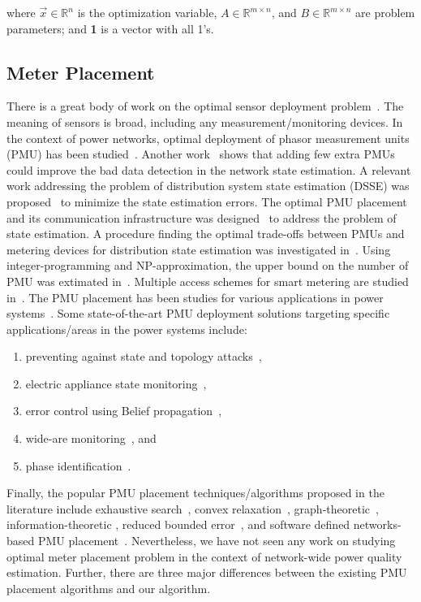 where $\vec{x}\in \mathbb{R}^n$ is the optimization variable, $A \in \mathbb{R}^{m \times n}$, and $B \in \mathbb{R}^{m \times n}$ are problem parameters;  and \textbf{1} is a vector with all 1's.

\subsection{Meter Placement}
There is a great body of work on the optimal sensor deployment problem~\cite{Krause09}. The meaning of sensors is broad, including any measurement/monitoring devices. In the context of power networks, optimal deployment of phasor measurement units (PMU) has been studied~\cite{Yuill11}. Another work~\cite{chen2006placement} shows that adding few extra PMUs could improve the bad data detection in the network state estimation. A relevant work addressing the problem of distribution system state estimation (DSSE) was proposed~\cite{singh2011meter} to minimize the state estimation errors. The optimal PMU placement and its communication infrastructure was designed~\cite{shahraeini2012co} to address the problem of state estimation. A procedure finding the optimal trade-offs between PMUs and metering devices for distribution state estimation was investigated in~\cite{liu2012trade}. Using integer-programming and NP-approximation, the upper bound on the number of PMU was extimated in~\cite{uddin2012approximate, uddin2014nested}. Multiple access schemes for smart metering are studied in~\cite{li2011efficient}. The PMU placement has been studies for various applications in power systems~\cite{de2010synchronized}. Some state-of-the-art PMU deployment solutions targeting specific applications/areas in the power systems include:

\begin{enumerate}
\item preventing against state and topology attacks~\cite{kim2013phasor},
\item electric appliance state monitoring~\cite{hao2012smart},
\item error control using Belief propagation~\cite{deka2011pmu},
\item wide-are monitoring~\cite{wen2013optimal}, and
\item phase identification~\cite{short2013advanced}.
\end{enumerate}

\vspace{0.5cm}
\noindent Finally, the popular PMU placement techniques/algorithms proposed in the literature include exhaustive search~\cite{azizi2012optimal}, convex relaxation~\cite{kekatos2012optimal}, graph-theoretic~\cite{anderson2012graph}, information-theoretic \cite{li2013information}, reduced bounded error~\cite{lunden2014real}, and software defined networks-based PMU placement~\cite{goodney2013efficient}. Nevertheless, we have not seen any work on studying optimal meter placement problem in the context of network-wide power quality estimation. Further, there are three major differences between the existing PMU placement algorithms and our algorithm.

